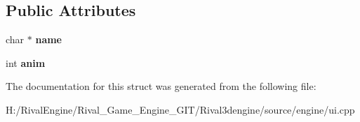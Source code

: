\subsection*{Public Attributes}
\begin{DoxyCompactItemize}
\item 
\mbox{\label{struct_u_i_1_1_model_preview_adb8d5e8dd285ccd0f45cd6202a972536}} 
char $\ast$ {\bfseries name}
\item 
\mbox{\label{struct_u_i_1_1_model_preview_a63411f8b6595580b911ba87af4c677c6}} 
int {\bfseries anim}
\end{DoxyCompactItemize}


The documentation for this struct was generated from the following file\+:\begin{DoxyCompactItemize}
\item 
H\+:/\+Rival\+Engine/\+Rival\+\_\+\+Game\+\_\+\+Engine\+\_\+\+G\+I\+T/\+Rival3dengine/source/engine/ui.\+cpp\end{DoxyCompactItemize}
